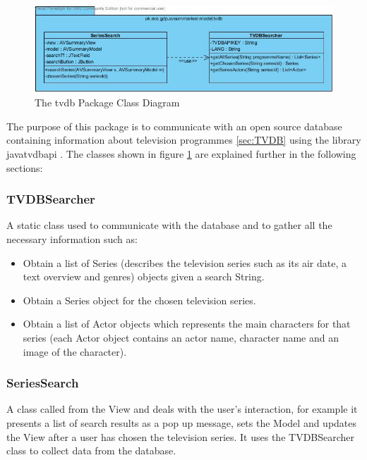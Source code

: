 \begin{figure}[h1]
\begin{center}
 \includegraphics[trim = 0mm 0mm 0mm 0mm, clip,
 scale=0.5]{Images/tvdb_package_class_diagram.jpg}
  \caption{The tvdb Package Class Diagram}\label{fig:tvdbPackageClass}
 \end{center}
\end{figure}

The purpose of this package is to communicate with an open source database containing information about television programmes \ref{sec:TVDB} using the library javatvdbapi  \cite{tvdbLibrary}. The classes shown in figure \ref{fig:tvdbPackageClass} are explained further in the following sections:

\subsubsection{TVDBSearcher}
A static class used to communicate with the database and to gather all the necessary information such as:
\begin{itemize}
	\item{Obtain a list of Series (describes the television series such as its air date, a text overview and genres) objects given a search String.}
	\item{Obtain a Series object for the chosen television series.}
	\item{Obtain a list of Actor objects which represents the main characters for that series (each Actor object contains an actor name, character name and an image of the character).}	
\end{itemize}

\subsubsection{SeriesSearch}
A class called from the View and deals with the user's interaction, for example it presents a list of search results as a pop up message, sets the Model and updates the View after a user has chosen the television series. It uses the TVDBSearcher class to collect data from the database.

